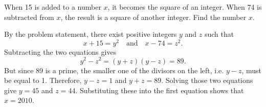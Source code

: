 \begin{question}
    When 15 is added to a number $x$, it becomes the square of an integer. When
    74 is subtracted from $x$, the result is a square of another integer. Find
    the number $x$. 
\end{question}
\begin{solution}
    By the problem statement, there exist positive integers $y$ and $z$ such
    that
    \[ x + 15 = y^2 \quad \text{and} \quad x - 74 = z^2. \]
    Subtracting the two equations gives
    \[ y^2 - z^2 = (y + z)(y - z) = 89. \]
    But since 89 is a prime, the smaller one of the divisors on the left, i.e.
    $y - z$, must be equal to 1. Therefore, $y - z = 1$ and $y + z = 89$.
    Solving those two equations give $y = 45$ and $z = 44$. Substituting these
    into the first equation shows that $x = 2010$.
\end{solution}


